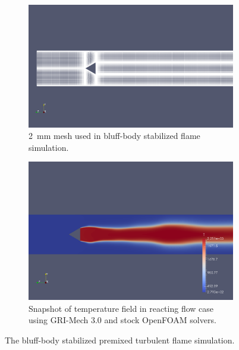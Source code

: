\documentclass[a4paper,10pt]{article}
\begin{document}
\begin{figure}[!htb]
  \begin{subfigure}[t]{0.45\textwidth}
   \includegraphics[width=\textwidth]{mesh.png}
   \caption{\SI{2}{\milli\meter} mesh used in bluff-body stabilized flame simulation.}
   \label{F:mesh}
  \end{subfigure}%
  \qquad
  \begin{subfigure}[t]{0.45\textwidth}
   \includegraphics[width=\textwidth]{flame.png}
   \caption{Snapshot of temperature field in reacting flow case using GRI-Mech 3.0 and stock OpenFOAM solvers.}
   \label{F:flame}
  \end{subfigure}
  \caption{The bluff-body stabilized premixed turbulent flame simulation.}
\end{figure}




\appendix
\setcounter{figure}{0}
\setcounter{table}{0}
\end{document}
